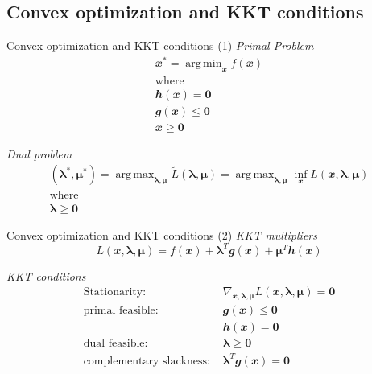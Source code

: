 \documentclass{bredelebeamer}
\DeclareMathOperator*{\argmax}{arg\,max}
\DeclareMathOperator*{\argmin}{arg\,min}
\begin{document}
\subsection{Convex optimization and KKT conditions}
\begin{frame}{Convex optimization and KKT conditions (1)}
  \textit{Primal Problem}
  \begin{equation}
    \begin{gathered}
      \mathbfit{x}^* = \argmin_{\mathbfit{x}} f(\mathbfit{x}) \\
      \textrm{where} \\
      \mathbfit{h}(\mathbfit{x}) = \mathbf{0} \\
      \mathbfit{g}(\mathbfit{x}) \leq \mathbf{0} \\
      \mathbfit{x} \geq \mathbf{0}
    \end{gathered}
  \end{equation}


  \textit{Dual problem}
  \begin{equation}
    \begin{gathered}
      (\boldsymbol{\lambda}^*,\boldsymbol{\mu}^*)
      = \argmax_{\boldsymbol{\lambda},\boldsymbol{\mu}} \tilde{L}(\boldsymbol{\lambda},\boldsymbol{\mu})
      = \argmax_{\boldsymbol{\lambda},\boldsymbol{\mu}} \inf_{\mathbfit{x}} L(\mathbfit{x}, \boldsymbol{\lambda}, \boldsymbol{\mu}) \\
      \textrm{where} \\
      \boldsymbol{\lambda} \geq \mathbf{0}
    \end{gathered}
  \end{equation}
\end{frame}

\begin{frame}{Convex optimization and KKT conditions (2)}
  \textit{KKT multipliers}
  \begin{equation}
    L(\mathbfit{x}, \boldsymbol{\lambda}, \boldsymbol{\mu})
    = f(\mathbfit{x}) + \boldsymbol{\lambda}^T \mathbfit{g}(\mathbfit{x})
    + \boldsymbol{\mu}^T \mathbfit{h}(\mathbfit{x})
  \end{equation}

  \textit{KKT conditions}
  \begin{equation}
    \begin{split}
      \textrm{Stationarity: }
      & \nabla_{\mathbfit{x}, \boldsymbol{\lambda}, \boldsymbol{\mu}}
      L(\mathbfit{x}, \boldsymbol{\lambda}, \boldsymbol{\mu})
      = \mathbf{0} \\
      \textrm{primal feasible: }
      & \mathbfit{g}(\mathbfit{x}) \leq \mathbf{0} \\
      & \mathbfit{h}(\mathbfit{x}) = \mathbf{0} \\
      \textrm{dual feasible: }
      & \boldsymbol{\lambda} \geq \mathbf{0} \\
      \textrm{complementary slackness: }
      & \boldsymbol{\lambda}^T \mathbfit{g}(\mathbfit{x}) = \mathbf{0}
    \end{split}
  \end{equation}
\end{frame}
\end{document}

